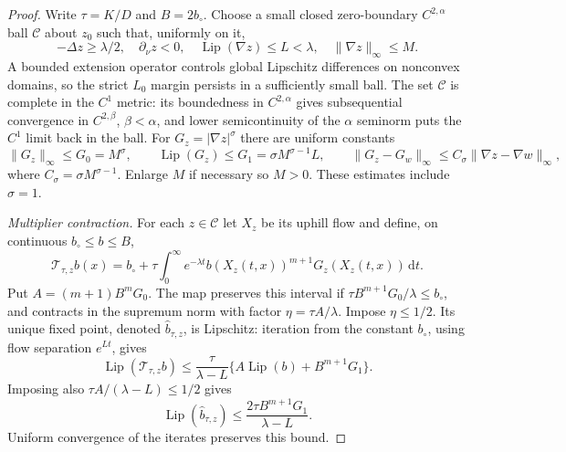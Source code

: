 \documentclass[11pt,a4paper]{article}
\theoremstyle{definition}\newtheorem{definition}[theorem]{Definition}
\theoremstyle{remark}\newtheorem{remark}[theorem]{Remark}
\newcommand{\dd}{\,\mathrm d}
\begin{document}
\begin{proof}
Write $\tau=K/D$ and $B=2b_\circ$. Choose a small closed zero-boundary
$C^{2,\alpha}$ ball $\mathcal C$ about $z_0$ such that, uniformly on it,
\[
 -\Delta z\geq\lambda/2,\quad \partial_\nu z<0,\quad
 \operatorname{Lip}(\nabla z)\leq L<\lambda,\quad
 \|\nabla z\|_\infty\leq M.
\]
A bounded extension operator controls global Lipschitz differences on nonconvex
domains, so the strict $L_0$ margin persists in a sufficiently small ball.
The set $\mathcal C$ is complete in the $C^1$ metric: its boundedness in
$C^{2,\alpha}$ gives subsequential convergence in $C^{2,\beta}$, $\beta<\alpha$,
and lower semicontinuity of the $\alpha$ seminorm puts the $C^1$ limit back
in the ball. For $G_z=|\nabla z|^\sigma$ there are uniform constants
\[
 \|G_z\|_\infty\leq G_0=M^\sigma,\qquad
 \operatorname{Lip}(G_z)\leq G_1=\sigma M^{\sigma-1}L,\qquad
 \|G_z-G_w\|_\infty\leq C_\sigma\|\nabla z-\nabla w\|_\infty,
\]
where $C_\sigma=\sigma M^{\sigma-1}$. Enlarge $M$ if necessary so $M>0$.
These estimates include $\sigma=1$.

\emph{Multiplier contraction.} For each $z\in\mathcal C$ let $X_z$ be its
uphill flow and define, on continuous $b_\circ\leq b\leq B$,
\begin{equation}
 \mathcal T_{\tau,z}b(x)=b_\circ+\tau\int_0^\infty e^{-\lambda t}
 b(X_z(t,x))^{m+1}G_z(X_z(t,x))\dd t.\label{eq:nonlinearresolvent}
\end{equation}
Put $A=(m+1)B^mG_0$. The map preserves this interval if
$\tau B^{m+1}G_0/\lambda\leq b_\circ$, and contracts in the supremum norm
with factor $\eta=\tau A/\lambda$. Impose $\eta\leq1/2$.
Its unique fixed point, denoted $\widehat b_{\tau,z}$, is Lipschitz:
iteration from the constant $b_\circ$, using flow separation $e^{Lt}$, gives
\[
 \operatorname{Lip}(\mathcal T_{\tau,z}b)
 \leq\frac{\tau}{\lambda-L}
       \{A\operatorname{Lip}(b)+B^{m+1}G_1\}.
\]
Imposing also $\tau A/(\lambda-L)\leq1/2$ gives
\begin{equation}
 \operatorname{Lip}(\widehat b_{\tau,z})
 \leq\frac{2\tau B^{m+1}G_1}{\lambda-L}.\label{eq:blip}
\end{equation}
Uniform convergence of the iterates preserves this bound.


\end{proof}
\end{document}
